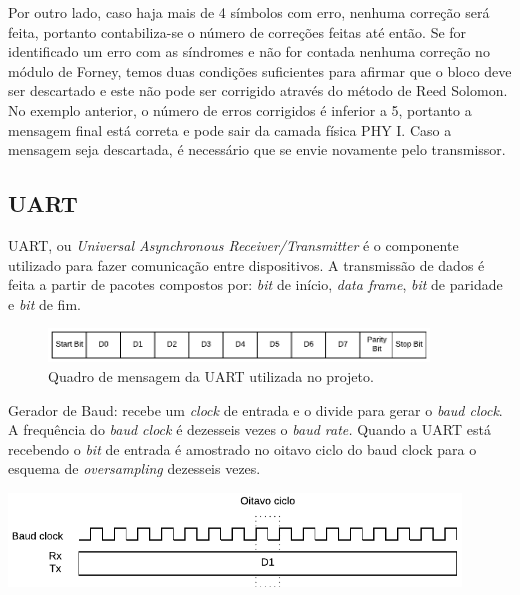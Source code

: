 	Por outro lado, caso haja mais de 4 símbolos com erro, nenhuma correção será feita, portanto contabiliza-se o número de correções feitas até então. Se for identificado um erro com as síndromes e não for contada nenhuma correção no módulo de Forney, temos duas condições suficientes para afirmar que o bloco deve ser descartado e este não pode ser corrigido através do método de Reed Solomon. No exemplo anterior, o número de erros corrigidos é inferior a 5, portanto a mensagem final está correta e pode sair da camada física PHY I. Caso a mensagem seja descartada, é necessário que se envie novamente pelo transmissor.

	\subsection{UART}

	UART, ou \textit{Universal Asynchronous Receiver/Transmitter} é o componente utilizado para fazer comunicação entre dispositivos. A transmissão de dados é feita a partir de pacotes compostos por: \textit{bit} de início, \textit{data frame}, \textit{bit} de paridade e \textit{bit} de fim.
	\begin{figure}[h]
		\caption{\label{figure:uart-frame}Quadro de mensagem da UART utilizada no projeto.}
		\centering
		\includegraphics[width=0.9\textwidth]{uart/frame.pdf}
	\end{figure}

	Gerador de Baud: recebe um \textit{clock} de entrada e o divide para gerar o \textit{baud clock}. A frequência do \textit{baud clock} é dezesseis vezes o \textit{baud rate.} Quando a UART está recebendo o \textit{bit} de entrada é amostrado no oitavo ciclo do baud clock para o esquema de \textit{oversampling} dezesseis vezes.

	\begin{chart}[h]
		\caption{\label{figure:uart-txrx}\textit{Oversampling} com \textit{baud clock}.}
		\centering
		\includegraphics[width=0.9\textwidth]{uart/txrx.pdf}
	\end{chart}

